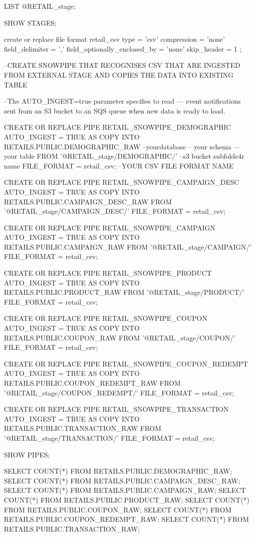 LIST @RETAIL_stage;

SHOW STAGES;

create or replace file format retail_csv
    type = 'csv' 
    compression = 'none' 
    field_delimiter = ','
    field_optionally_enclosed_by = 'none'
    skip_header = 1 ; 


    --CREATE SNOWPIPE THAT RECOGNISES CSV THAT ARE INGESTED FROM EXTERNAL STAGE AND COPIES THE DATA INTO EXISTING TABLE

--The AUTO_INGEST=true parameter specifies to read 
--- event notifications sent from an S3 bucket to an SQS queue when new data is ready to load.


CREATE OR REPLACE PIPE RETAIL_SNOWPIPE_DEMOGRAPHIC AUTO_INGEST = TRUE AS
COPY INTO RETAILS.PUBLIC.DEMOGRAPHIC_RAW --yourdatabase -- your schema ---your table
FROM '@RETAIL_stage/DEMOGRAPHIC/' --s3 bucket subfolde4r name
FILE_FORMAT = retail_csv; --YOUR CSV FILE FORMAT NAME

CREATE OR REPLACE PIPE RETAIL_SNOWPIPE_CAMPAIGN_DESC AUTO_INGEST = TRUE AS
COPY INTO RETAILS.PUBLIC.CAMPAIGN_DESC_RAW
FROM '@RETAIL_stage/CAMPAIGN_DESC/'
FILE_FORMAT = retail_csv;

CREATE OR REPLACE PIPE RETAIL_SNOWPIPE_CAMPAIGN AUTO_INGEST = TRUE AS
COPY INTO RETAILS.PUBLIC.CAMPAIGN_RAW
FROM '@RETAIL_stage/CAMPAIGN/'
FILE_FORMAT = retail_csv;

CREATE OR REPLACE PIPE RETAIL_SNOWPIPE_PRODUCT AUTO_INGEST = TRUE AS
COPY INTO RETAILS.PUBLIC.PRODUCT_RAW
FROM '@RETAIL_stage/PRODUCT/' 
FILE_FORMAT = retail_csv;


CREATE OR REPLACE PIPE RETAIL_SNOWPIPE_COUPON AUTO_INGEST = TRUE AS
COPY INTO RETAILS.PUBLIC.COUPON_RAW
FROM '@RETAIL_stage/COUPON/' 
FILE_FORMAT = retail_csv;

CREATE OR REPLACE PIPE RETAIL_SNOWPIPE_COUPON_REDEMPT  AUTO_INGEST = TRUE AS
COPY INTO RETAILS.PUBLIC.COUPON_REDEMPT_RAW
FROM '@RETAIL_stage/COUPON_REDEMPT/' 
FILE_FORMAT = retail_csv;

CREATE OR REPLACE PIPE RETAIL_SNOWPIPE_TRANSACTION  AUTO_INGEST = TRUE AS
COPY INTO RETAILS.PUBLIC.TRANSACTION_RAW
FROM '@RETAIL_stage/TRANSACTION/' 
FILE_FORMAT = retail_csv;

SHOW PIPES;

SELECT COUNT(*) FROM RETAILS.PUBLIC.DEMOGRAPHIC_RAW;
SELECT COUNT(*) FROM RETAILS.PUBLIC.CAMPAIGN_DESC_RAW;
SELECT COUNT(*) FROM RETAILS.PUBLIC.CAMPAIGN_RAW;
SELECT COUNT(*) FROM RETAILS.PUBLIC.PRODUCT_RAW;
SELECT COUNT(*) FROM RETAILS.PUBLIC.COUPON_RAW;
SELECT COUNT(*) FROM RETAILS.PUBLIC.COUPON_REDEMPT_RAW;
SELECT COUNT(*) FROM RETAILS.PUBLIC.TRANSACTION_RAW;

